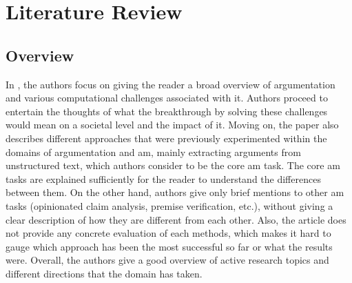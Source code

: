 \section{Literature Review}
    \subsection{Overview}
        In \autocite{Lippi2016ArgumentationMS}, the authors focus on giving the reader a broad overview of argumentation and various computational challenges associated with it. Authors proceed to entertain the thoughts of what the breakthrough by solving these challenges would mean on a societal level and the impact of it. Moving on, the paper also describes different approaches that were previously experimented within the domains of argumentation and \gls{am}, mainly extracting arguments from unstructured text, which authors consider to be the core \gls{am} task. The core \gls{am} tasks are explained sufficiently for the reader to understand the differences between them. On the other hand, authors give only brief mentions to other \gls{am} tasks (opinionated claim analysis, premise verification, etc.), without giving a clear description of how they are different from each other. Also, the article does not provide any concrete evaluation of each methods, which makes it hard to gauge which approach has been the most successful so far or what the results were. Overall, the authors give a good overview of active research topics and different directions that the domain has taken.
        
